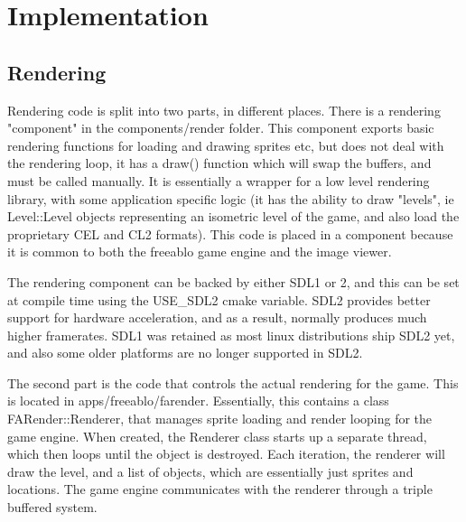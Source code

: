 \chapter{Implementation}

 \section{Rendering}  
    Rendering code is split into two parts, in different places. There is a rendering "component" in the components/render folder.
    This component exports basic rendering functions for loading and drawing sprites etc, but does not deal with the rendering loop, it has a draw() function which will swap the buffers, and must be called manually.   
    It is essentially a wrapper for a low level rendering library, with some application specific logic (it has the ability to draw "levels", ie Level::Level objects representing an isometric level of the game, and also load the proprietary CEL and CL2 formats).
    This code is placed in a component because it is common to both the freeablo game engine and the image viewer.
    
    The rendering component can be backed by either SDL1 or 2, and this can be set at compile time using the USE\_SDL2 cmake variable. SDL2 provides better support for hardware acceleration, and as a result, normally produces much higher framerates. SDL1 was retained as most linux distributions ship SDL2 yet, and also some older platforms are no longer supported in SDL2.
    
    \mbox{}
    
    The second part is the code that controls the actual rendering for the game. This is located in apps/freeablo/farender. Essentially, this contains a class FARender::Renderer, that manages sprite loading and render looping for the game engine.  
    When created, the Renderer class starts up a separate thread, which then loops until the object is destroyed. Each iteration, the renderer will draw the level, and a list of objects, which are essentially just sprites and locations.
    The game engine communicates with the renderer through a triple buffered system.
    
